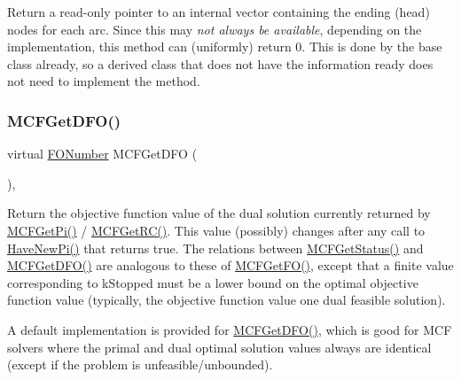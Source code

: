 Return a read-\/only pointer to an internal vector containing the ending (head) nodes for each arc. Since this may {\itshape not always be available}, depending on the implementation, this method can (uniformly) return 0. This is done by the base class already, so a derived class that does not have the information ready does not need to implement the method. \mbox{\label{class_m_c_f_class_aca66f278ea62640af8e54590c687d715}} 
\subsubsection{\texorpdfstring{M\+C\+F\+Get\+D\+F\+O()}{MCFGetDFO()}}
{\footnotesize\ttfamily virtual \mbox{\hyperlink{class_m_c_f_class_af5ee7b3099b0bc780a6a4b43629488fa}{F\+O\+Number}} M\+C\+F\+Get\+D\+FO (\begin{DoxyParamCaption}\item[{void}]{ }\end{DoxyParamCaption})\hspace{0.3cm}{\ttfamily [inline]}, {\ttfamily [virtual]}}

Return the objective function value of the dual solution currently returned by \mbox{\hyperlink{class_m_c_f_class_a8f1a95d5c707f83ffc6aecba1e7e0e10}{M\+C\+F\+Get\+Pi()}} / \mbox{\hyperlink{class_m_c_f_class_af027cee8179a876a4879c73820c380d1}{M\+C\+F\+Get\+R\+C()}}. This value (possibly) changes after any call to \mbox{\hyperlink{class_m_c_f_class_a87b2b6516a7874ac55145312bd2d55bb}{Have\+New\+Pi()}} that returns true. The relations between \mbox{\hyperlink{class_m_c_f_class_a333e27ad7a73779b096cb70829cbe8be}{M\+C\+F\+Get\+Status()}} and \mbox{\hyperlink{class_m_c_f_class_aca66f278ea62640af8e54590c687d715}{M\+C\+F\+Get\+D\+F\+O()}} are analogous to these of \mbox{\hyperlink{class_m_c_f_class_a109d7c021feda837d8ca5051fc24b6ea}{M\+C\+F\+Get\+F\+O()}}, except that a finite value corresponding to k\+Stopped must be a lower bound on the optimal objective function value (typically, the objective function value one dual feasible solution).

A default implementation is provided for \mbox{\hyperlink{class_m_c_f_class_aca66f278ea62640af8e54590c687d715}{M\+C\+F\+Get\+D\+F\+O()}}, which is good for M\+CF solvers where the primal and dual optimal solution values always are identical (except if the problem is unfeasible/unbounded). \mbox{\label{class_m_c_f_class_a109d7c021feda837d8ca5051fc24b6ea}} 
